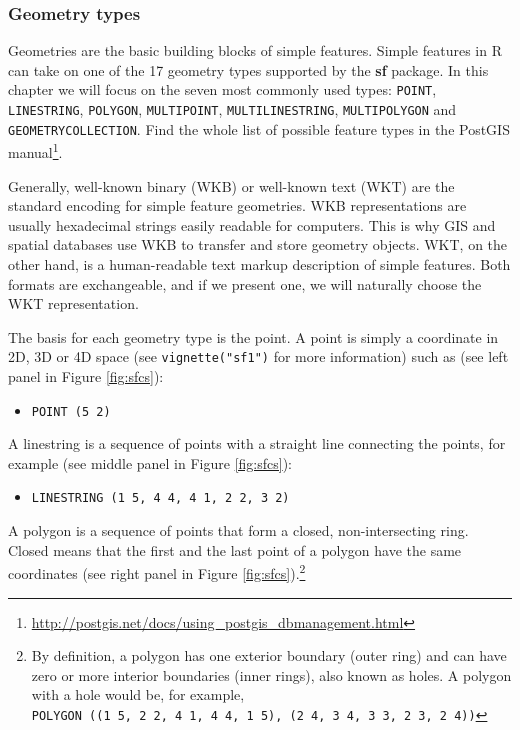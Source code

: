 \documentclass[]{krantz}
\providecommand{\tightlist}{%
  \setlength{\itemsep}{0pt}\setlength{\parskip}{0pt}}
\let\rmarkdownfootnote\footnote%
\def\footnote{\protect\rmarkdownfootnote}
\renewcommand{\href}[2]{#2\footnote{\url{#1}}}
\begin{document}
\hypertarget{geometry}{%
\subsubsection{Geometry types}\label{geometry}}

Geometries are the basic building blocks of simple features.
Simple features in R can take on one of the 17 geometry types supported by the \textbf{sf} package.
In this chapter we will focus on the seven most commonly used types: \texttt{POINT}, \texttt{LINESTRING}, \texttt{POLYGON}, \texttt{MULTIPOINT}, \texttt{MULTILINESTRING}, \texttt{MULTIPOLYGON} and \texttt{GEOMETRYCOLLECTION}.
Find the whole list of possible feature types in \href{http://postgis.net/docs/using_postgis_dbmanagement.html}{the PostGIS manual}.

Generally, well-known binary (WKB) or well-known text (WKT) are the standard encoding for simple feature geometries.
WKB representations are usually hexadecimal strings easily readable for computers.
This is why GIS and spatial databases use WKB to transfer and store geometry objects.
WKT, on the other hand, is a human-readable text markup description of simple features.
Both formats are exchangeable, and if we present one, we will naturally choose the WKT representation.

The basis for each geometry type is the point.
A point is simply a coordinate in 2D, 3D or 4D space (see \texttt{vignette("sf1")} for more information) such as (see left panel in Figure \ref{fig:sfcs}):

\begin{itemize}
\tightlist
\item
  \texttt{POINT\ (5\ 2)}
\end{itemize}

A linestring is a sequence of points with a straight line connecting the points, for example (see middle panel in Figure \ref{fig:sfcs}):

\begin{itemize}
\tightlist
\item
  \texttt{LINESTRING\ (1\ 5,\ 4\ 4,\ 4\ 1,\ 2\ 2,\ 3\ 2)}
\end{itemize}

A polygon is a sequence of points that form a closed, non-intersecting ring.
Closed means that the first and the last point of a polygon have the same coordinates (see right panel in Figure \ref{fig:sfcs}).\footnote{By definition, a polygon has one exterior boundary (outer ring) and can have zero or more interior boundaries (inner rings), also known as holes.
  A polygon with a hole would be, for example, \texttt{POLYGON\ ((1\ 5,\ 2\ 2,\ 4\ 1,\ 4\ 4,\ 1\ 5),\ (2\ 4,\ 3\ 4,\ 3\ 3,\ 2\ 3,\ 2\ 4))}}
\end{document}
